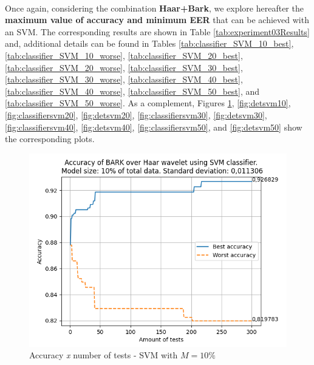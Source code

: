 \\
\par Once again, considering the combination \textbf{Haar+Bark}, we explore hereafter the \textbf{maximum value of accuracy and minimum EER} that can be achieved with an SVM. The corresponding results are shown in Table \ref{tab:experiment03Results} and, additional details can be found in Tables \ref{tab:classifier_SVM_10_best}, \ref{tab:classifier_SVM_10_worse}, \ref{tab:classifier_SVM_20_best}, \ref{tab:classifier_SVM_20_worse}, \ref{tab:classifier_SVM_30_best}, \ref{tab:classifier_SVM_30_worse}, \ref{tab:classifier_SVM_40_best}, \ref{tab:classifier_SVM_40_worse}, \ref{tab:classifier_SVM_50_best}, and \ref{tab:classifier_SVM_50_worse}. As a complement, Figures \ref{fig:classifiersvm10}, \ref{fig:detsvm10}, \ref{fig:classifiersvm20}, \ref{fig:detsvm20}, \ref{fig:classifiersvm30}, \ref{fig:detsvm30}, \ref{fig:classifiersvm40}, \ref{fig:detsvm40}, \ref{fig:classifiersvm50}, and \ref{fig:detsvm50} show the corresponding plots.






\begin{figure}[H]
\centering
\includegraphics[scale=.6]{images/results/confusionMatrices/classifier_SVM_10.png}
\caption{Accuracy \textit{x} number of tests - SVM with $M=10\%$}
\label{fig:classifiersvm10}
\end{figure}
